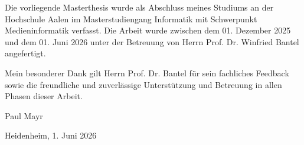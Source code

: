 \documentclass[oneside]{ausarbeitung}
\begin{document}
Die vorliegende Masterthesis wurde als Abschluss meines Studiums an der Hochschule Aalen im Masterstudiengang Informatik mit Schwerpunkt Medieninformatik verfasst. Die Arbeit wurde zwischen dem 01. Dezember 2025 und dem 01. Juni 2026 unter der Betreuung von Herrn Prof. Dr. Winfried Bantel angefertigt.  

Mein besonderer Dank gilt Herrn Prof. Dr. Bantel für sein fachliches Feedback sowie die freundliche und zuverlässige Unterstützung und Betreuung in allen Phasen dieser Arbeit. 

\vspace{3cm}

Paul Mayr

\vspace{1cm}

Heidenheim, 1. Juni 2026


\begin{abstract}

In dieser Arbeit wird die Entwicklung eines \textit{JSONPath}-Compilers nach RFC-9535 mit \textit{flex} und \textit{Bison} vorgestellt. Diese erfolgt als erster Teil der Erfüllung des Gesamtziels, einen Interpreter für JSONPath-Ausdrücke zu entwickeln, damit diese für Abfragen an die NoSQL-Datenbank \textit{YottaDB} verwendet werden können.

Der Fokus des entwickelten Systems liegt dabei neben einer klar strukturierten komponentenbasierten Architektur auf einer Implementation, die zur JSONPath-Definition in RFC-9535 konform ist.

Der vom Compiler mittels der \textit{Bison-Syntaxtree-Hack}-Klasse automatisiert erzeugte Syntaxbaum stellt neben dem modularen Gesamtsystem den Ausgangspunkt für die Entwicklung eines JSONPath-Interpreters dar, für welchen auch ein theoretischer Grundstein in dieser Arbeit gelegt wird.

Diese Arbeit befasst sich außerdem ebenfalls theoretisch mit Möglichkeiten, die Suche in YottaDB beschleunigen zu können und erstellt hierfür Kriterien, anhand welcher mögliche Algorithmen auf deren Eignung in Hinsicht auf Laufzeit und Speicherkomplexität überprüft werden können.

\end{abstract}
\cleardoublepage
\tableofcontents

\listoffigures

\end{document}
